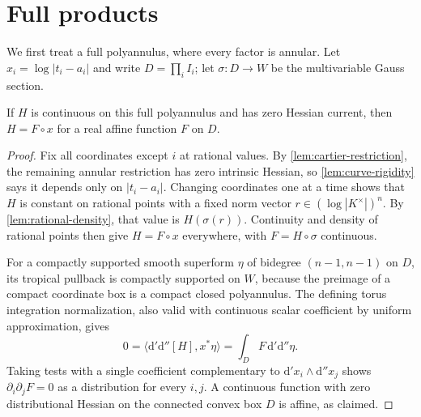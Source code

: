 \documentclass[11pt,a4paper]{amsart}
\begin{document}
\section{Full products}\label{sec:products}

We first treat a full polyannulus, where every factor is annular. Let $x_i=\log|t_i-a_i|$ and write $D=\prod_i I_i$; let $\sigma:D\to W$ be the multivariable Gauss section.

\begin{proposition}\label{prop:polyannulus}
If $H$ is continuous on this full polyannulus and has zero Hessian current, then $H=F\circ x$ for a real affine function $F$ on $D$.
\end{proposition}

\begin{proof}
Fix all coordinates except $i$ at rational values. By \cref{lem:cartier-restriction}, the remaining annular restriction has zero intrinsic Hessian, so \cref{lem:curve-rigidity} says it depends only on $|t_i-a_i|$. Changing coordinates one at a time shows that $H$ is constant on rational points with a fixed norm vector $r\in(\log|K^\times|)^n$. By \cref{lem:rational-density}, that value is $H(\sigma(r))$. Continuity and density of rational points then give $H=F\circ x$ everywhere, with $F=H\circ\sigma$ continuous.

For a compactly supported smooth superform $\eta$ of bidegree $(n-1,n-1)$ on $D$, its tropical pullback is compactly supported on $W$, because the preimage of a compact coordinate box is a compact closed polyannulus. The defining torus integration normalization, also valid with continuous scalar coefficient by uniform approximation, gives
\[
 0=\langle\mathrm d'\mathrm d''[H],x^*\eta\rangle
   =\int_D F\,\mathrm d'\mathrm d''\eta.
\]
Taking tests with a single coefficient complementary to $\mathrm d'x_i\wedge\mathrm d''x_j$ shows $\partial_i\partial_jF=0$ as a distribution for every $i,j$. A continuous function with zero distributional Hessian on the connected convex box $D$ is affine, as claimed.
\end{proof}
\end{document}
